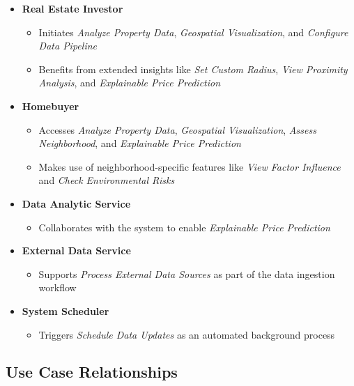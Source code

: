 \begin{itemize}
	\item \textbf{Real Estate Investor}
	      \begin{itemize}
	      	\item Initiates \textit{Analyze Property Data}, \textit{Geospatial Visualization}, and \textit{Configure Data Pipeline}
	      	\item Benefits from extended insights like \textit{Set Custom Radius}, \textit{View Proximity Analysis}, and \textit{Explainable Price Prediction}
	      \end{itemize}
	      
	\item \textbf{Homebuyer}
	      \begin{itemize}
	      	\item Accesses \textit{Analyze Property Data}, \textit{Geospatial Visualization}, \textit{Assess Neighborhood}, and \textit{Explainable Price Prediction}
	      	\item Makes use of neighborhood-specific features like \textit{View Factor Influence} and \textit{Check Environmental Risks}
	      \end{itemize}
	      
	\item \textbf{Data Analytic Service}
	      \begin{itemize}
	      	\item Collaborates with the system to enable \textit{Explainable Price Prediction}
	      \end{itemize}
	      
	\item \textbf{External Data Service}
	      \begin{itemize}
	      	\item Supports \textit{Process External Data Sources} as part of the data ingestion workflow
	      \end{itemize}
	      
	\item \textbf{System Scheduler}
	      \begin{itemize}
	      	\item Triggers \textit{Schedule Data Updates} as an automated background process
	      \end{itemize}
\end{itemize}

\subsection{Use Case Relationships}

